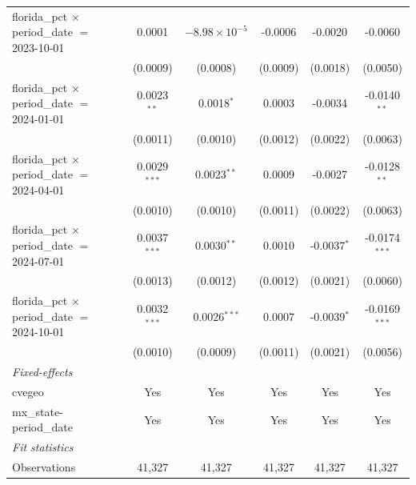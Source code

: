 \begin{table}[htbp]
\begin{tabular}{lccccc}
      florida\_pct $\times$ period\_date $=$ 2023-10-01    & 0.0001          & $-8.98\times 10^{-5}$  & -0.0006         & -0.0020               & -0.0060\\   
                                                           & (0.0009)        & (0.0008)               & (0.0009)        & (0.0018)              & (0.0050)\\   
      florida\_pct $\times$ period\_date $=$ 2024-01-01    & 0.0023$^{**}$   & 0.0018$^{*}$           & 0.0003          & -0.0034               & -0.0140$^{**}$\\   
                                                           & (0.0011)        & (0.0010)               & (0.0012)        & (0.0022)              & (0.0063)\\   
      florida\_pct $\times$ period\_date $=$ 2024-04-01    & 0.0029$^{***}$  & 0.0023$^{**}$          & 0.0009          & -0.0027               & -0.0128$^{**}$\\   
                                                           & (0.0010)        & (0.0010)               & (0.0011)        & (0.0022)              & (0.0063)\\   
      florida\_pct $\times$ period\_date $=$ 2024-07-01    & 0.0037$^{***}$  & 0.0030$^{**}$          & 0.0010          & -0.0037$^{*}$         & -0.0174$^{***}$\\   
                                                           & (0.0013)        & (0.0012)               & (0.0012)        & (0.0021)              & (0.0060)\\   
      florida\_pct $\times$ period\_date $=$ 2024-10-01    & 0.0032$^{***}$  & 0.0026$^{***}$         & 0.0007          & -0.0039$^{*}$         & -0.0169$^{***}$\\   
                                                           & (0.0010)        & (0.0009)               & (0.0011)        & (0.0021)              & (0.0056)\\   
      \midrule
      \emph{Fixed-effects}\\
      cvegeo                                               & Yes             & Yes                    & Yes             & Yes                   & Yes\\  
      mx\_state-period\_date                               & Yes             & Yes                    & Yes             & Yes                   & Yes\\  
      \midrule
      \emph{Fit statistics}\\
      Observations                                         & 41,327          & 41,327                 & 41,327          & 41,327                & 41,327\\  

\end{tabular}
\end{table}
